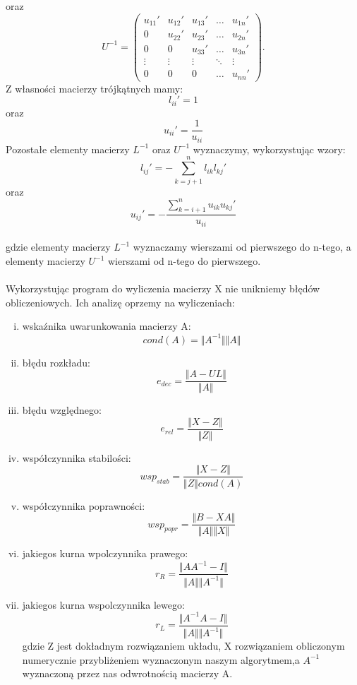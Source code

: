 \documentclass[12pt]{article}
\begin{document}
oraz
\[
U^{-1}=\begin{pmatrix}
u_{11}' & u_{12}' & u_{13}' & \ldots & u_{1n}' \\
0 & u_{22}' & u_{23}' & \ldots & u_{2n}' \\
0 & 0 & u_{33}' & \ldots & u_{3n}' \\
\vdots & \vdots & \vdots & \ddots & \vdots \\
0 & 0 & 0 & \ldots & u_{nn}'
\end{pmatrix}.
\]
Z w\l{}asno\'sci macierzy tr\'ojk\k{a}tnych mamy:
\[
l_{ii}'=1
\]
oraz
\[
u_{ii}'=\frac{1}{u_{ii}}
\]
Pozosta\l{}e elementy macierzy $L^{-1}$ oraz $U^{-1}$ wyznaczymy, wykorzystuj\k{a}c wzory:
\[
l_{ij}'=-\sum_{k=j+1}^n l_{ik}l_{kj}'
\]
oraz
\[
u_{ij}'=-\frac{\sum_{k=i+1}^n u_{ik}u_{kj}'}{u_{ii}}
\]
\\
gdzie elementy macierzy $L^{-1}$ wyznaczamy wierszami od pierwszego do n-tego, a elementy macierzy $U^{-1}$ wierszami od n-tego do pierwszego. 
\\
\\
Wykorzystuj\k{a}c program do wyliczenia macierzy X nie unikniemy b\l{}\k{e}d\'ow obliczeniowych. Ich analiz\k{e} oprzemy na wyliczeniach:
\begin{enumerate}[i)]
\item wska\'znika uwarunkowania macierzy A:
\[
cond(A)=\Vert A^{-1}\Vert  \Vert A \Vert
\]
\item b\l{}\k{e}du rozk\l{}adu:
\[
e_{dec}=\frac{\Vert A-UL \Vert}{\Vert A \Vert}
\]
\item b\l{}\k{e}du wzgl\k{e}dnego:
\[
e_{rel}=\frac{\Vert X-Z \Vert}{\Vert Z \Vert}
\]
\item wsp\'o\l{}czynnika stabilo\'sci:
\[
wsp_{stab}=\frac{\Vert X-Z \Vert}{\Vert Z \Vert cond(A)}
\]
\item wsp\'o\l{}czynnika poprawno\'sci:
\[
wsp_{popr}=\frac{\Vert B-XA \Vert}{\Vert A \Vert \Vert X \Vert}
\]
\item jakiegos kurna wpolczynnika prawego:
\[
r_{R}=\frac{\Vert AA^{-1}-I\Vert}{\Vert A \Vert \Vert A^{-1} \Vert}
\]
\item jakiegos kurna wspolczynnika lewego:
\[
r_{L}=\frac{\Vert A^{-1}A-I\Vert}{\Vert A \Vert \Vert A^{-1} \Vert}
\]
gdzie Z jest dok\l{}adnym rozwi\k{a}zaniem uk\l{}adu, X rozwi\k{a}zaniem obliczonym numerycznie przybli\.zeniem wyznaczonym naszym algorytmem,a $A^{-1}$ wyznaczon\k{a} przez nas odwrotno\'sci\k{a} macierzy A. 


\end{enumerate}
\end{document}
